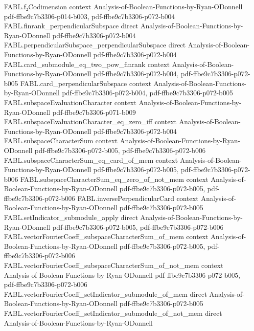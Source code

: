 \begin{theorem}
\proofstep
  {FABL.f₂Codimension}
  {context}
  {Analysis-of-Boolean-Functions-by-Ryan-ODonnell}
  {pdf-ffbe9c7b3306-p014-b003,
    pdf-ffbe9c7b3306-p072-b004}
\proofstep
  {FABL.finrank_perpendicularSubspace}
  {direct}
  {Analysis-of-Boolean-Functions-by-Ryan-ODonnell}
  {pdf-ffbe9c7b3306-p072-b004}
\proofstep
  {FABL.perpendicularSubspace_perpendicularSubspace}
  {direct}
  {Analysis-of-Boolean-Functions-by-Ryan-ODonnell}
  {pdf-ffbe9c7b3306-p072-b004}
\proofstep
  {FABL.card_submodule_eq_two_pow_finrank}
  {context}
  {Analysis-of-Boolean-Functions-by-Ryan-ODonnell}
  {pdf-ffbe9c7b3306-p072-b004,
    pdf-ffbe9c7b3306-p072-b005}
\proofstep
  {FABL.card_perpendicularSubspace}
  {context}
  {Analysis-of-Boolean-Functions-by-Ryan-ODonnell}
  {pdf-ffbe9c7b3306-p072-b004,
    pdf-ffbe9c7b3306-p072-b005}
\proofstep
  {FABL.subspaceEvaluationCharacter}
  {context}
  {Analysis-of-Boolean-Functions-by-Ryan-ODonnell}
  {pdf-ffbe9c7b3306-p071-b009}
\proofstep
  {FABL.subspaceEvaluationCharacter_eq_zero_iff}
  {context}
  {Analysis-of-Boolean-Functions-by-Ryan-ODonnell}
  {pdf-ffbe9c7b3306-p072-b004}
\proofstep
  {FABL.subspaceCharacterSum}
  {context}
  {Analysis-of-Boolean-Functions-by-Ryan-ODonnell}
  {pdf-ffbe9c7b3306-p072-b005,
    pdf-ffbe9c7b3306-p072-b006}
\proofstep
  {FABL.subspaceCharacterSum_eq_card_of_mem}
  {context}
  {Analysis-of-Boolean-Functions-by-Ryan-ODonnell}
  {pdf-ffbe9c7b3306-p072-b005,
    pdf-ffbe9c7b3306-p072-b006}
\proofstep
  {FABL.subspaceCharacterSum_eq_zero_of_not_mem}
  {context}
  {Analysis-of-Boolean-Functions-by-Ryan-ODonnell}
  {pdf-ffbe9c7b3306-p072-b005,
    pdf-ffbe9c7b3306-p072-b006}
\proofstep
  {FABL.inversePerpendicularCard}
  {context}
  {Analysis-of-Boolean-Functions-by-Ryan-ODonnell}
  {pdf-ffbe9c7b3306-p072-b005}
\proofstep
  {FABL.setIndicator_submodule_apply}
  {direct}
  {Analysis-of-Boolean-Functions-by-Ryan-ODonnell}
  {pdf-ffbe9c7b3306-p072-b005,
    pdf-ffbe9c7b3306-p072-b006}
\proofstep
  {FABL.vectorFourierCoeff_subspaceCharacterSum_of_mem}
  {context}
  {Analysis-of-Boolean-Functions-by-Ryan-ODonnell}
  {pdf-ffbe9c7b3306-p072-b005,
    pdf-ffbe9c7b3306-p072-b006}
\proofstep
  {FABL.vectorFourierCoeff_subspaceCharacterSum_of_not_mem}
  {context}
  {Analysis-of-Boolean-Functions-by-Ryan-ODonnell}
  {pdf-ffbe9c7b3306-p072-b005,
    pdf-ffbe9c7b3306-p072-b006}
\proofstep
  {FABL.vectorFourierCoeff_setIndicator_submodule_of_mem}
  {direct}
  {Analysis-of-Boolean-Functions-by-Ryan-ODonnell}
  {pdf-ffbe9c7b3306-p072-b005}
\proofstep
  {FABL.vectorFourierCoeff_setIndicator_submodule_of_not_mem}
  {direct}
  {Analysis-of-Boolean-Functions-by-Ryan-ODonnell}

\end{theorem}
